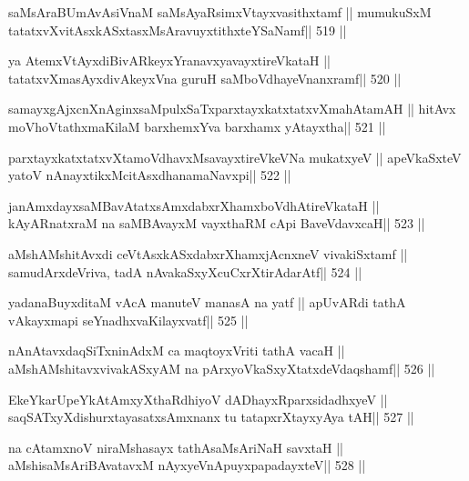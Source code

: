 \begin{shl}
saMsAraBUmAvAsiVnaM saMsAyaRsimxVtayxvasithxtamf ||
mumukuSxM tatatxvXvitAsxkASxtasxMsAravuyxtithxteYSaNamf\hfill || 519 ||
\end{shl}

\begin{shl}
ya AtemxVtAyxdiBivARkeyxYranavxyavayxtireVkataH ||
tatatxvXmasAyxdivAkeyxVna guruH saMboVdhayeVnanxramf\hfill || 520 ||
\end{shl}

\begin{shl}
samayxgAjxcnXnAginxsaMpulxSaTxparxtayxkatxtatxvXmahAtamAH ||
hitAvx moVhoVtathxmaKilaM barxhemxYva barxhamx yAtayxtha\hfill || 521 ||
\end{shl}

\begin{shl}
parxtayxkatxtatxvXtamoVdhavxMsavayxtireVkeVNa mukatxyeV ||
apeVkaSxteV yatoV nAnayxtikxMcitAsxdhanamaNavxpi\hfill || 522 ||
\end{shl}

\begin{shl}
janAmxdayxsaMBavAtatxsAmxdabxrXhamxboVdhAtireVkataH ||
kAyARnatxraM na saMBAvayxM vayxthaRM cApi BaveVdavxcaH\hfill || 523 ||
\end{shl}

\begin{shl}
aMshAMshitAvxdi ceVtAsxkASxdabxrXhamxjAcnxneV vivakiSxtamf ||
samudArxdeVriva, tadA nAvakaSxyXcuCxrXtirAdarAtf\hfill || 524 ||
\end{shl}

\begin{shl}
yadanaBuyxditaM vAcA manuteV manasA na yatf ||
apUvARdi tathA vAkayxmapi seYnadhxvaKilayxvatf\hfill || 525 ||
\end{shl}

\begin{shl}
nAnAtavxdaqSiTxninAdxM ca maqtoyxVriti tathA vacaH ||
aMshAMshitavxvivakASxyAM na pArxyoVkaSxyXtatxdeVdaqshamf\hfill || 526 ||
\end{shl}

\begin{shl}
EkeYkarUpeYkAtAmxyXthaRdhiyoV dADhayxRparxsidadhxyeV ||
saqSATxyXdishurxtayasatxsAmxnanx tu tatapxrXtayxyAya tAH\hfill || 527 ||
\end{shl}

\begin{shl}
na cA\s\s tamxnoV niraMshasayx tathA\s saMsAriNaH savxtaH ||
aMshisaMsAriBAvatavxM nAyxyeVnApuyxpapadayxteV\hfill || 528 ||
\end{shl}

